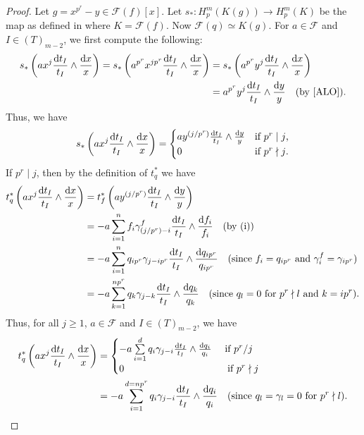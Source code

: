 \documentclass[times,10pt]{amsart}
\newcommand{\dd}{{\rm d}}
\newcommand{\F}{\ensuremath{\mathcal{F}}}
\renewcommand{\cong}{\simeq}
\begin{document}
\begin{proof}
 Let $g= x^{p^r}-{y}\in \F(f)[x]$. Let $s_*: H_p^m(K(g))\xrightarrow{} H_p^m(K)$ be the  map as defined in \cite[Proposition 3.4]{ALO} where $K= \F(f)$.  Now $\F(q)\cong K(g)$. For $a\in \F$ and $I\in (T)_{m-2}$,  we first compute the following:\begin{align*}
     s_*\left( ax^j\frac{\dd t_I}{t_I}\wedge \frac{\dd x}{x}\right)= s_*\left( a^{p^r}x^{jp^r} \frac{\dd t_I}{t_I}\wedge \frac{\dd x}{x}\right)&= s_*\left( a^{p^r} {y}^j\frac{\dd t_I}{t_I}\wedge \frac{\dd x}{x}\right)\\&= a^{p^r} {y}^j\frac{\dd t_I}{t_I}\wedge \frac{\dd {y}}{{y}}\quad \text{(by \cite[Proposition 3.4]{ALO})}.
 \end{align*} Thus, we have \begin{align*}
     s_*\left( ax^j \frac{\dd t_I}{t_I}\wedge \frac{\dd x}{x}\right)=\begin{cases}
         a {y}^{(j/p^r)} \frac{\dd t_I}{t_I}\wedge \frac{\dd {y}}{{y}}&\text{if $p^r\mid j$,}\\0&\text{if $p^r\nmid j$.} \end{cases}
 \end{align*}   If {$p^r\mid j$}, then by the definition of $t_q^*$ we have   \begin{align*}
     t_q^*\left( ax^j \frac{\dd t_I}{t_I}\wedge \frac{\dd x}{x}\right)&= t_f^*\left( a{y}^{(j/p^r)} \frac{\dd t_I}{t_I}\wedge \frac{\dd {y}}{{y}}\right)\\&= -a\sum_{i=1}^{n}f_i \gamma^f_{(j/p^r)-i} \frac{\dd t_I}{t_I}\wedge \frac{\dd f_i}{f_i}\quad \text{(by (i))}\\&= -a\sum_{i=1}^{n} q_{ip^r} \gamma_{j-ip^r}\frac{\dd t_I}{t_I}\wedge \frac{\dd q_{ip^r}}{q_{ip^r}}\quad \text{(since $f_i= q_{ip^r}$ and $\gamma^f_i= \gamma_{ip^r}$)}\\&= -a\sum_{k=1}^{np^r} q_k \gamma_{j-k}\frac{\dd t_I}{t_I}\wedge \frac{\dd q_k}{q_k}\quad \text{(since $q_l=0$ for $p^r\nmid l$ and $k=ip^r$)}.
 \end{align*}  Thus, for all $j\geq 1 $, $a\in \F$ and $I\in (T)_{m-2}$,  we have \begin{align*}
      t_q^*\left( ax^j \frac{\dd t_I}{t_I}\wedge \frac{\dd x}{x}\right)&= \begin{cases} -a \sum\limits_{i=1}^{d} q_i\gamma_{j-i} \frac{\dd t_I}{t_I}\wedge \frac{\dd q_i}{q_i}\quad \text{ if $p^r/j$}\\ 0\hspace{37mm} \text{if $p^r\nmid j$}\end{cases}\\&=-a\sum_{i=1}^{d=np^r} q_i \gamma_{j-i}\frac{\dd t_I}{t_I}\wedge \frac{\dd q_i}{q_i} \quad \text{(since $q_l=\gamma_l=0$ for $p^r\nmid l$)}.
 \end{align*}\end{proof}
\end{document}
